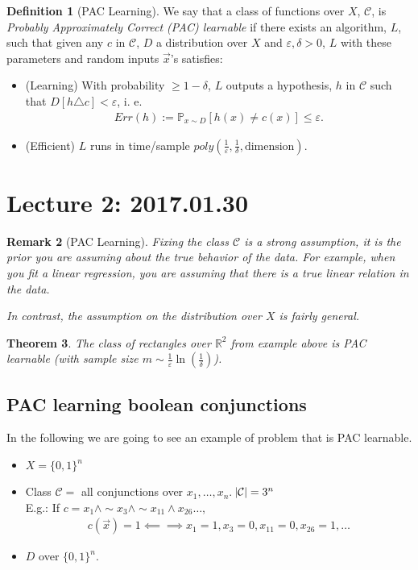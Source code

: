 \documentclass[12pt, letterpaper]{article}
\newcommand{\R}{\mathbb{R}}
\newcommand{\mb}{\mathbb}
\newcommand{\mc}{\mathcal}
\newcommand{\ve}{\varepsilon}
\newtheorem{theorem}{Theorem}[section]
\newtheorem{remark}[theorem]{Remark}
\theoremstyle{definition}
\newtheorem{definition}[theorem]{Definition}
\theoremstyle{remark}
\begin{document}
\begin{definition}[PAC Learning]
	We say that a class of functions over $X$, $\mc C$, is \emph{Probably Approximately Correct (PAC) learnable} if there exists an algorithm, $L$, such that given any $c$ in $\mc C$, $D$ a distribution over $X$ and $\ve, \delta >0$, $L$ with these parameters and random inputs $\vec x$'s satisfies:  
	\begin{itemize}
		\item (Learning) With probability $\geq 1 -\delta$, $L$ outputs a hypothesis, $h$ in $\mc 
		C$ such that $D[h\triangle c]<\ve$, i. e.
		\begin{align}
    		Err(h) := \mb P_{x\sim D}[h(x) \ne c(x)] \leq \ve.
		\end{align}
		\item (Efficient) $L$ runs in time/sample $poly\left(\frac1\ve, \frac1\delta, \textrm{dimension}\right)$.
	\end{itemize}
\end{definition}


\section{Lecture 2: 2017.01.30}

\begin{remark}[PAC Learning]
    Fixing the class $\mc C$ is a strong assumption, it is the prior you are assuming about the true behavior of the data. For example, when you fit a linear regression, you are assuming that there is a true linear relation in the data.
    
    In contrast, the assumption on the distribution over $X$ is fairly general.
\end{remark}

\begin{theorem}
    The class of rectangles over $\R^2$ from example above is PAC learnable (with sample size $m\sim\frac1\ve\ln\left(\frac1\delta\right)$).
\end{theorem}

\subsection{PAC learning boolean conjunctions}

In the following we are going to see an example of problem that is PAC learnable.
\begin{itemize}
    \item $X = \lbrace 0, 1 \rbrace^n$
    \item Class $\mc C = $ all conjunctions over $x_1,\ldots,x_n$. $\abs{\mc C} = 3^n$\\
          E.g.: If $c = x_1\wedge \sim x_3 \wedge \sim x_{11} \wedge x_{26} \ldots$,
          \begin{align}
              c(\vec x) = 1 \impliedby\implies x_1 =1, x_3 = 0, x_{11} = 0, x_{26} = 1, \ldots
          \end{align}
    \item $D$ over $\lbrace 0, 1 \rbrace^n$.
\end{itemize}
\end{document}
